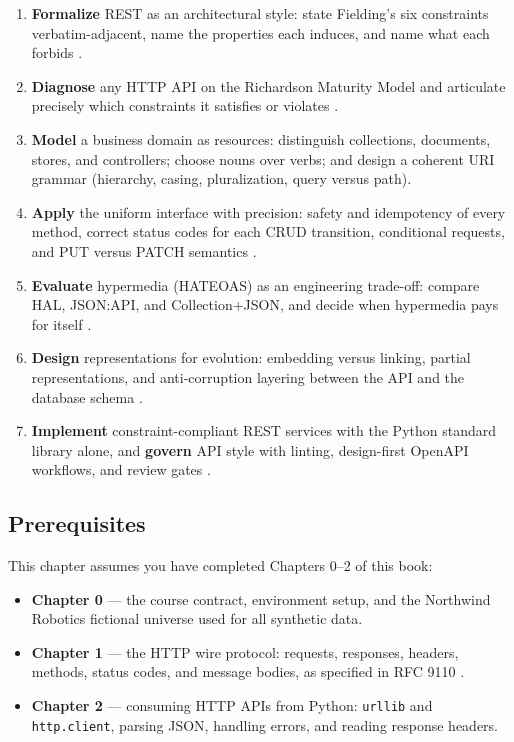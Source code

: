 \begin{enumerate}
  \item \textbf{Formalize} REST as an architectural style: state Fielding's six
        constraints verbatim-adjacent, name the properties each induces, and name
        what each forbids \cite{fielding2000rest}.
  \item \textbf{Diagnose} any HTTP API on the Richardson Maturity Model and
        articulate precisely which constraints it satisfies or violates
        \cite{richardson2013restful}.
  \item \textbf{Model} a business domain as resources: distinguish collections,
        documents, stores, and controllers; choose nouns over verbs; and design a
        coherent URI grammar (hierarchy, casing, pluralization, query versus path).
  \item \textbf{Apply} the uniform interface with precision: safety and
        idempotency of every method, correct status codes for each CRUD
        transition, conditional requests, and PUT versus PATCH semantics
        \cite{rfc9110}.
  \item \textbf{Evaluate} hypermedia (HATEOAS) as an engineering trade-off:
        compare HAL, JSON:API, and Collection+JSON, and decide when hypermedia
        pays for itself \cite{rfc8288}.
  \item \textbf{Design} representations for evolution: embedding versus linking,
        partial representations, and anti-corruption layering between the API and
        the database schema \cite{kleppmann2017ddia}.
  \item \textbf{Implement} constraint-compliant REST services with the Python
        standard library alone, and \textbf{govern} API style with linting,
        design-first OpenAPI workflows, and review gates \cite{openapi31,gehl2021apidesign}.
\end{enumerate}

\subsection*{Prerequisites}

This chapter assumes you have completed Chapters 0--2 of this book:

\begin{itemize}
  \item \textbf{Chapter 0} --- the course contract, environment setup, and the
        Northwind Robotics fictional universe used for all synthetic data.
  \item \textbf{Chapter 1} --- the HTTP wire protocol: requests, responses,
        headers, methods, status codes, and message bodies, as specified in
        RFC 9110 \cite{rfc9110}.
  \item \textbf{Chapter 2} --- consuming HTTP APIs from Python: \texttt{urllib}
        and \texttt{http.client}, parsing JSON, handling errors, and reading
        response headers.
\end{itemize}

